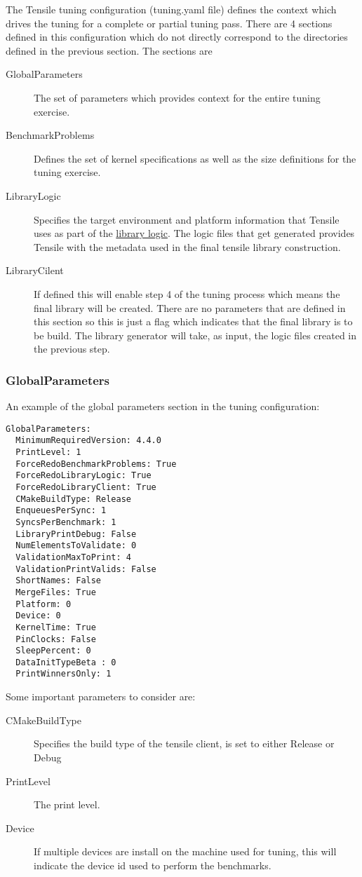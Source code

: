 \documentclass[]{article}
\begin{document}
The Tensile tuning configuration (tuning.yaml file) defines the context which drives the tuning for a complete or partial tuning pass. There are 4 sections defined in this configuration which do not directly correspond to the directories defined in the previous section. The sections are 

\begin{description}
\item[GlobalParameters] The set of parameters which provides context for the entire tuning exercise. 
\item[BenchmarkProblems] Defines the set of kernel specifications as well as the size definitions for the tuning exercise.
\item[LibraryLogic] Specifies the target environment and platform information that Tensile uses as part of the \hyperref[sec:LibraryLogic]{library logic}. The logic files that get generated provides Tensile with the metadata used in the final tensile library construction. 
\item[LibraryCilent] If defined this will enable step 4 of the tuning process which means the final library will be created. There are no parameters that are defined in this section so this is just a flag which indicates that the final library is to be build. The library generator will take, as input, the logic files created in the previous step.
\end{description}

\subsubsection{GlobalParameters}

An example of the global parameters section in the tuning configuration:
\begin{verbatim}
GlobalParameters:
  MinimumRequiredVersion: 4.4.0
  PrintLevel: 1
  ForceRedoBenchmarkProblems: True
  ForceRedoLibraryLogic: True
  ForceRedoLibraryClient: True
  CMakeBuildType: Release
  EnqueuesPerSync: 1
  SyncsPerBenchmark: 1
  LibraryPrintDebug: False
  NumElementsToValidate: 0
  ValidationMaxToPrint: 4
  ValidationPrintValids: False
  ShortNames: False
  MergeFiles: True
  Platform: 0
  Device: 0
  KernelTime: True
  PinClocks: False
  SleepPercent: 0
  DataInitTypeBeta : 0
  PrintWinnersOnly: 1
\end{verbatim}

Some important parameters to consider are:
\begin{description}
\item[CMakeBuildType] Specifies the build type of the tensile client, is set to either Release or Debug
\item[PrintLevel] The print level.
\item[Device] If multiple devices are install on the machine used for tuning, this will indicate the device id used to perform the benchmarks. 
\end{description}
\end{document}

